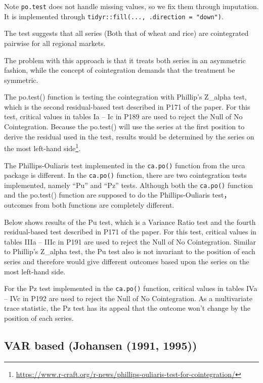 \documentclass[12pt,]{article}
\let\rmarkdownfootnote\footnote%
\def\footnote{\protect\rmarkdownfootnote}
\begin{document}
Note \texttt{po.test} does not handle missing values, so we fix them through imputation. It is implemented through \texttt{tidyr::fill(...,\ .direction\ =\ "down")}.

The test suggests that all series (Both that of wheat and rice) are cointegrated pairwise for all regional markets.

The problem with this approach is that it treats both series in an asymmetric fashion, while the concept of cointegration demands that the treatment be symmetric.

The po.test() function is testing the cointegration with Phillip's Z\_alpha test, which is the second residual-based test described in P171 of the paper. For this test, critical values in tables Ia -- Ic in P189 are used to reject the Null of No Cointegration. Because the po.test() will use the series at the first position to derive the residual used in the test, results would be determined by the series on the most left-hand side\footnote{\url{https://www.r-craft.org/r-news/phillips-ouliaris-test-for-cointegration/}}.

The Phillips-Ouliaris test implemented in the \texttt{ca.po()} function from the urca package is different. In the \texttt{ca.po()} function, there are two cointegration tests implemented, namely ``Pu'' and ``Pz'' tests. Although both the \texttt{ca.po()} function and the po.test() function are supposed to do the Phillips-Ouliaris test，outcomes from both functions are completely different.

Below shows results of the Pu test, which is a Variance Ratio test and the fourth residual-based test described in P171 of the paper. For this test, critical values in tables IIIa -- IIIc in P191 are used to reject the Null of No Cointegration. Similar to Phillip's Z\_alpha test, the Pu test also is not invariant to the position of each series and therefore would give different outcomes based upon the series on the most left-hand side.

For the Pz test implemented in the \texttt{ca.po()} function, critical values in tables IVa -- IVc in P192 are used to reject the Null of No Cointegration. As a multivariate trace statistic, the Pz test has its appeal that the outcome won't change by the position of each series.

\hypertarget{var-based-johansen-1991-1995}{%
\subsection{VAR based (Johansen (1991, 1995))}\label{var-based-johansen-1991-1995}}
\end{document}
